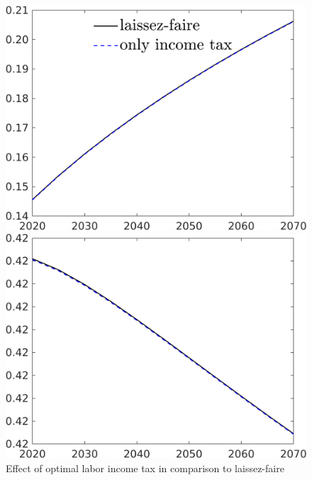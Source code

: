 
\begin{figure}[h!!]
	\centering
	\caption{Effect of optimal labor income tax in comparison to laissez-faire }\label{fig:LF_vs_onlytaul}
	\begin{minipage}[]{0.32\textwidth}
		\includegraphics[width=1\textwidth]{../../codding_model/own_basedOnFried/optimalPol_190722_tidiedUp/figures/all_10Aout22/CountTaul_modtest_target_GFF_spillover0_sep1_extern0_PV1_etaa0.79_lgd1.png}
	\end{minipage}
	\begin{minipage}[]{0.32\textwidth}
		\includegraphics[width=1\textwidth]{../../codding_model/own_basedOnFried/optimalPol_190722_tidiedUp/figures/all_10Aout22/CountTaul_modtest_target_EY_spillover0_sep1_extern0_PV1_etaa0.79_lgd0.png}

\end{minipage}
\end{figure}
